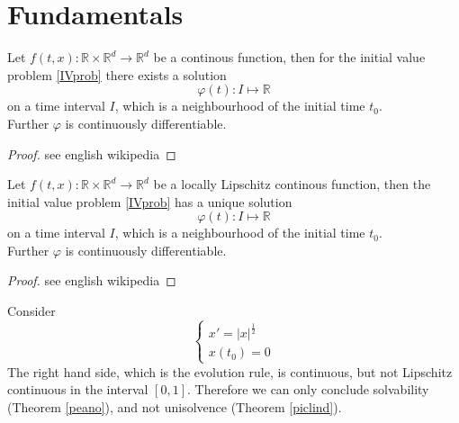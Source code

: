 
\section{Fundamentals}

\begin{framed}
\begin{theorem}[Peano]
    \label{peano}
    Let $f(t,x):\mathbb{R}\times \mathbb{R}^d \longrightarrow \mathbb{R}^d$ be a continous function, then for the initial value problem \eqref{IVprob} there exists a solution
    $$\varphi(t):I\mapsto\mathbb{R}$$
    on a time interval $I$, which is a neighbourhood of the initial time $t_0$.\\
    Further $\varphi$ is continuously differentiable.
\end{theorem}
\end{framed}
\begin{proof}
    see english wikipedia
\end{proof}
\begin{framed}
\begin{theorem}
    \label{piclind}
    Let $f(t,x):\mathbb{R}\times \mathbb{R}^d \longrightarrow \mathbb{R}^d$ be a locally Lipschitz continous function, then the initial value problem \eqref{IVprob} has a unique solution
    $$\varphi(t):I\mapsto\mathbb{R}$$
    on a time interval $I$, which is a neighbourhood of the initial time $t_0$.\\
    Further $\varphi$ is continuously differentiable.
\end{theorem}
\end{framed}
\begin{proof}
    see english wikipedia
\end{proof}
\begin{example}
    Consider
    \begin{equation}
    \begin{cases}
        x'=|x|^{\frac{1}{2}}\\
        x(t_0)=0
    \end{cases}
    \end{equation}
    The right hand side, which is the evolution rule, is continuous, but not Lipschitz continuous in the interval $[0,1]$. Therefore we can only conclude solvability (Theorem \ref{peano}), and not unisolvence (Theorem \ref{piclind}).
\end{example}

